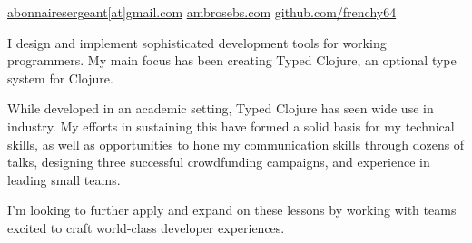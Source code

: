 \documentclass[10pt,a4paper]{article}
\begin{document}
\sloppy  %



\nobreakvspace{0.3em}  %

\noindent\href{mailto:abonnairesergeant.at.gmail.dot.com}{abonnairesergeant\mbox{}[at]\mbox{}gmail.com}\sbull
\href{http://ambrosebs.com/}{ambrosebs.com}\sbull
\href{https://github.com/frenchy64}{github.com/frenchy64}


\spacedhrule{0.9em}{-0.4em}  %


\vspace{-1.3em}  %
\begin{multicols}{2}  %
\noindent 
I design and implement sophisticated development tools for working programmers.
%
My main focus has been creating Typed Clojure, an optional type system for Clojure.
%

While developed in an academic setting, Typed Clojure 
has seen wide use in industry.
My efforts in sustaining this have formed a solid basis for my technical skills,
as well as opportunities to hone my communication skills through dozens of talks, 
designing three successful crowdfunding campaigns,
and experience in leading small teams.

I'm looking to further apply and expand on these lessons by working with teams
excited to craft world-class developer experiences.

\end{multicols}
\end{document}
